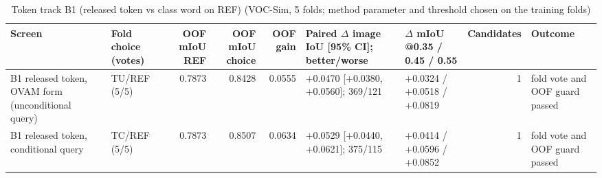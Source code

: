 \begin{table}[H]\centering\scriptsize\setlength{\tabcolsep}{3pt}
\begin{tabular}{>{\raggedright\arraybackslash}p{1.57cm}>{\raggedright\arraybackslash}p{1.40cm}rrr>{\raggedright\arraybackslash}p{1.40cm}>{\raggedright\arraybackslash}p{1.40cm}r>{\raggedright\arraybackslash}p{1.40cm}}
\toprule
Screen & Fold choice (votes) & OOF mIoU REF & OOF mIoU choice & OOF gain & Paired $\Delta$ image IoU [95\% CI]; better/\allowbreak{}worse & $\Delta$ mIoU @0.35 /\allowbreak{} 0.45 /\allowbreak{} 0.55 & Candidates & Outcome \\
\midrule
B1 released token, OVAM form (unconditional query) & TU/\allowbreak{}REF (5/\allowbreak{}5) & 0.7873 & 0.8428 & 0.0555 & +0.0470 [+0.0380, +0.0560]; 369/\allowbreak{}121 & +0.0324 /\allowbreak{} +0.0518 /\allowbreak{} +0.0819 & 1 & fold vote and OOF guard passed \\
B1 released token, conditional query & TC/\allowbreak{}REF (5/\allowbreak{}5) & 0.7873 & 0.8507 & 0.0634 & +0.0529 [+0.0440, +0.0621]; 375/\allowbreak{}115 & +0.0414 /\allowbreak{} +0.0596 /\allowbreak{} +0.0852 & 1 & fold vote and OOF guard passed \\
\bottomrule
\end{tabular}
\caption{Token track B1 (released token vs class word on REF) (VOC-Sim, 5 folds; method parameter and threshold chosen on the training folds)}\label{tab:a11_cv_summary}
\end{table}
